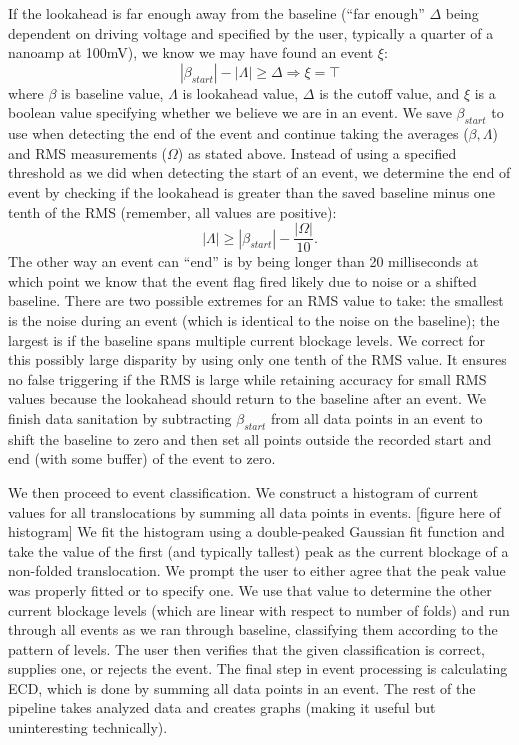 \documentclass[aps,prl,preprint,groupedaddress]{revtex4}
\begin{document}
If the lookahead is far enough away from the baseline (``far enough'' \(\Delta\) being dependent on driving voltage and specified by the user, typically a quarter of a nanoamp at 100mV), we know we may have found an event \(\xi\):
\begin{equation} |\beta_{start}| - |\Lambda| \geq \Delta \Rightarrow \xi = \top \label{eq:event-start}\end{equation}
where \(\beta\) is baseline value, \(\Lambda\) is lookahead value, \(\Delta\) is the cutoff value, and \(\xi\) is a boolean value specifying whether we believe we are in an event.
We save \(\beta_{start}\) to use when detecting the end of the event and continue taking the averages (\(\beta, \Lambda\)) and RMS measurements (\(\Omega\)) as stated above.
Instead of using a specified threshold as we did when detecting the start of an event, we determine the end of event by checking if the lookahead is greater than the saved baseline minus one tenth of the RMS (remember, all values are positive):
\begin{equation}|\Lambda| \geq |\beta_{start}| - \frac{|\Omega|}{10}. \label{eq:event-end}\end{equation}
The other way an event can ``end'' is by being longer than 20 milliseconds at which point we know that the event flag fired likely due to noise or a shifted baseline.
There are two possible extremes for an RMS value to take: the smallest is the noise during an event (which is identical to the noise on the baseline); the largest is if the baseline spans multiple current blockage levels.
We correct for this possibly large disparity by using only one tenth of the RMS value.
It ensures no false triggering if the RMS is large while retaining accuracy for small RMS values because the lookahead should return to the baseline after an event.
We finish data sanitation by subtracting \(\beta_{start}\) from all data points in an event to shift the baseline to zero and then set all points outside the recorded start and end (with some buffer) of the event to zero.

We then proceed to event classification.
We construct a histogram of current values for all translocations by summing all data points in events. [figure here of histogram]
We fit the histogram using a double-peaked Gaussian fit function and take the value of the first (and typically tallest) peak as the current blockage of a non-folded translocation.
We prompt the user to either agree that the peak value was properly fitted or to specify one.
We use that value to determine the other current blockage levels (which are linear with respect to number of folds) and run through all events as we ran through baseline, classifying them according to the pattern of levels.
The user then verifies that the given classification is correct, supplies one, or rejects the event.
The final step in event processing is calculating ECD, which is done by summing all data points in an event.
The rest of the pipeline takes analyzed data and creates graphs (making it useful but uninteresting technically).
\end{document}
